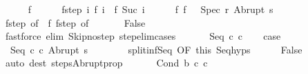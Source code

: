 \begin{isabellebody}
\ \ \ \ \isamarkupfalse%
\ f\isanewline
\ \ \ \ \isamarkupfalse%
\ f{\isacharunderscore}step{\isacharcolon}\ {\isachardoublequoteopen}{\isasymAnd}i{\isachardot}\ {\isasymGamma}{\isasymturnstile}f\ i\ {\isasymrightarrow}\ f\ {\isacharparenleft}Suc\ i{\isacharparenright}{\isachardoublequoteclose}\isanewline
\ \ \ \ \isamarkupfalse%
\ f{\isacharunderscore}{}{\isacharcolon}\ {\isachardoublequoteopen}f\ {}\ {\isacharequal}\ {\isacharparenleft}Spec\ r{\isacharcomma}\ Abrupt\ s{\isacharparenright}{\isachardoublequoteclose}\ \isanewline
\ \ \ \ \isamarkupfalse%
\ f{\isacharunderscore}step\ {\isacharbrackleft}of\ {}{\isacharbrackright}\ f{\isacharunderscore}{}\ f{\isacharunderscore}step\ {\isacharbrackleft}of\ {}{\isacharbrackright}\isanewline
\ \ \ \ \isamarkupfalse%
\ False\isanewline
\ \ \ \ \ \ \isamarkupfalse%
\ {\isacharparenleft}fastforce\ elim{\isacharcolon}\ Skip{\isacharunderscore}no{\isacharunderscore}step\ step{\isacharunderscore}elim{\isacharunderscore}cases{\isacharparenright}\isanewline
\ \ \isamarkupfalse%
\isanewline
{}\isamarkupfalse%
\isanewline
\ \ \isamarkupfalse%
\ {\isacharparenleft}Seq\ c\ c\isanewline
\ \ \isamarkupfalse%
\ {\isacharquery}case\isanewline
\ \ \isamarkupfalse%
\ \isanewline
\ \ \ \ \isamarkupfalse%
\ {\isachardoublequoteopen}{\isasymGamma}{\isasymturnstile}\ {\isacharparenleft}Seq\ c\ c\ Abrupt\ s{\isacharparenright}\ {\isasymrightarrow}\ {\isasymdots}{\isacharparenleft}{\isasyminfinity}{\isacharparenright}{\isachardoublequoteclose}\isanewline
\ \ \ \ \isamarkupfalse%
\ split{\isacharunderscore}inf{\isacharunderscore}Seq\ {\isacharbrackleft}OF\ this{\isacharbrackright}\ Seq{\isachardot}hyps\isanewline
\ \ \ \ \isamarkupfalse%
\ False\isanewline
\ \ \ \ \ \ \isamarkupfalse%
\ {\isacharparenleft}auto\ dest{\isacharcolon}\ steps{\isacharunderscore}Abrupt{\isacharunderscore}prop{\isacharparenright}\isanewline
\ \ \isamarkupfalse%
\isanewline
{}\isamarkupfalse%
\isanewline
\ \ \isamarkupfalse%
\ {\isacharparenleft}Cond\ b\ c\ c\ \isanewline
\ \ \isamarkupfalse%

\end{isabellebody}
